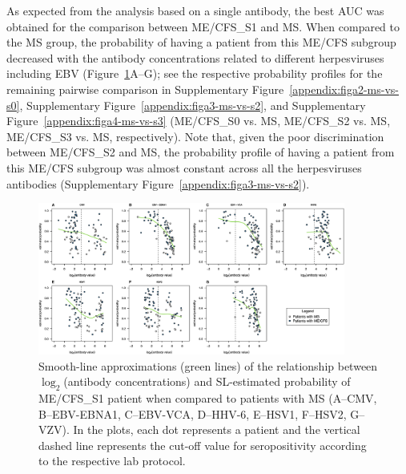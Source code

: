 As expected from the analysis based on a single antibody, the best AUC was obtained for the comparison between ME/CFS\_S1 and MS. When compared to the MS group, the probability of having a patient from this ME/CFS subgroup decreased with the antibody concentrations related to different herpesviruses including EBV (Figure~\ref{fig:fig4-smooth-line-approximations}A--G); see the respective probability profiles for the remaining pairwise comparison in Supplementary Figure~\ref{appendix:figa2-ms-vs-s0}, Supplementary Figure~\ref{appendix:figa3-ms-vs-s2}, and Supplementary Figure~\ref{appendix:figa4-ms-vs-s3} (ME/CFS\_S0 vs. MS, ME/CFS\_S2 vs. MS, ME/CFS\_S3 vs. MS, respectively). Note that, given the poor discrimination between ME/CFS\_S2 and MS, the probability profile of having a patient from this ME/CFS subgroup was almost constant across all the herpesviruses antibodies (Supplementary Figure~\ref{appendix:figa3-ms-vs-s2}).


\begin{figure}[h]
    \centering
    \includegraphics[width=0.9\textwidth]{chapter/2023-sym-and-herpesvirus/figures/fig4-smooth-line-approximations.jpg}
    \caption[Smooth-line approximations of the relationship between $\log_{2}$(antibody concentrations) and SL-estimated probability of ME/CFS\_S1 patient when compared to patients with MS]{Smooth-line approximations (green lines) of the relationship between $\log_{2}$(antibody concentrations) and SL-estimated probability of ME/CFS\_S1 patient when compared to patients with MS (A--CMV, B--EBV-EBNA1, C--EBV-VCA, D--HHV-6, E--HSV1, F--HSV2, G--VZV). In the plots, each dot represents a patient and the vertical dashed line represents the cut-off value for seropositivity according to the respective lab protocol.}
    \label{fig:fig4-smooth-line-approximations}
\end{figure}


